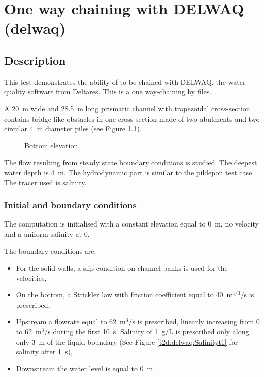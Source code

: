 \chapter{One way chaining with DELWAQ (delwaq)}

\section{Description}

This test demonstrates the ability of  to be chained
with DELWAQ, the water quality software from Deltares.
This is a one way-chaining by files.

A 20~m wide and 28.5~m long prismatic channel with trapezoidal cross-section
contains bridge-like obstacles in one cross-section made of two abutments and two
circular 4~m diameter piles (see Figure \ref{t2d:delwaq:fig:Bottom}).

\begin{figure}[!htbp]
 \centering
 \caption{Bottom elevation.}
 \label{t2d:delwaq:fig:Bottom}
\end{figure}

The flow resulting from steady state boundary conditions is studied.
The deepest water depth is 4~m.
The hydrodynamic part is similar to the pildepon test case.
The tracer used is salinity.

\subsection{Initial and boundary conditions}

The computation is initialised with a constant elevation equal to 0~m,
no velocity and a uniform salinity at 0.

The boundary conditions are:
\begin{itemize}
\item For the solid walls, a slip condition on channel banks is used for the
velocities,
\item On the bottom, a Strickler law with friction coefficient equal to
40~m$^{1/3}$/s is prescribed,
\item Upstream a flowrate equal to 62~m$^3$/s is prescribed,
linearly increasing from 0 to 62~m$^3$/s during the first 10~s.
Salinity of 1~g/L is prescribed only along only 3~m of the liquid boundary
(See Figure \ref{t2d:delwaq:Salinityt1} for salinity after 1~s),
\item Downstream the water level is equal to 0~m.
\end{itemize}

